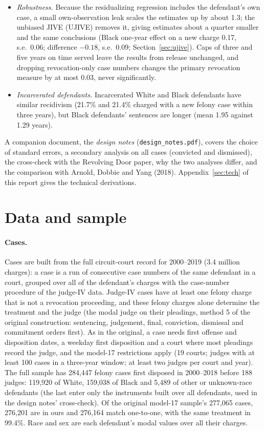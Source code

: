 \documentclass[11pt]{article}
\begin{document}
\begin{itemize}
  \item \emph{Robustness.} Because the residualizing regression includes the defendant's own case, a small own-observation leak scales the estimates up by about 1.3; the unbiased JIVE (UJIVE) removes it, giving estimates about a quarter smaller and the same conclusions (Black one-year effect on a new charge 0.17, s.e.\ 0.06; difference $-0.18$, s.e.\ 0.09; Section~\ref{sec:ujive}). Caps of three and five years on time served leave the results from release unchanged, and dropping revocation-only case numbers changes the primary revocation measure by at most 0.03, never significantly.
  \item \emph{Incarcerated defendants.} Incarcerated White and Black defendants have similar recidivism (21.7\% and 21.4\% charged with a new felony case within three years), but Black defendants' sentences are longer (mean 1.95 against 1.29 years).
\end{itemize}

A companion document, the \emph{design notes} (\texttt{design\_notes.pdf}), covers the choice of standard errors, a secondary analysis on all cases (convicted and dismissed), the cross-check with the Revolving Door paper, why the two analyses differ, and the comparison with Arnold, Dobbie and Yang (2018). Appendix~\ref{sec:tech} of this report gives the technical derivations.

\section{Data and sample}\label{sec:data}

\paragraph{Cases.} Cases are built from the full circuit-court record for 2000--2019 (3.4 million charges): a case is a run of consecutive case numbers of the same defendant in a court, grouped over all of the defendant's charges with the case-number procedure of the judge-IV data. Judge-IV cases have at least one felony charge that is not a revocation proceeding, and these felony charges alone determine the treatment and the judge (the modal judge on their pleadings, method 5 of the original construction: sentencing, judgement, final, conviction, dismissal and commitment orders first). As in the original, a case needs first offense and disposition dates, a weekday first disposition and a court where most pleadings record the judge, and the model-17 restrictions apply (19 courts; judges with at least 100 cases in a three-year window; at least two judges per court and year). The full sample has 284,447 felony cases first disposed in 2000--2018 before 188 judges: 119,920 of White, 159,038 of Black and 5,489 of other or unknown-race defendants (the last enter only the instruments built over all defendants, used in the design notes' cross-check). Of the original model-17 sample's 277,065 cases, 276,201 are in ours and 276,164 match one-to-one, with the same treatment in 99.4\%. Race and sex are each defendant's modal values over all their charges.
\end{document}
